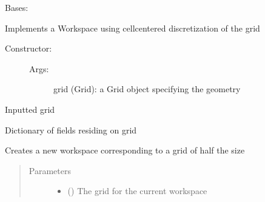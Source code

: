 \documentclass[letterpaper,10pt,english]{sphinxmanual}
\begin{document}
\begin{fulllineitems}
\label{\detokenize{autoapi/CellCenterWS/index:CellCenterWS.CellCenterWS}}
\sphinxAtStartPar
Bases: 

\sphinxAtStartPar
Implements a Workspace using cell\sphinxhyphen{}centered discretization of the grid
\begin{description}
\item[{Constructor:}] \leavevmode\begin{description}
\item[{Args:}] \leavevmode
\sphinxAtStartPar
grid (Grid): a Grid object specifying the geometry

\end{description}

\end{description}

\begin{fulllineitems}
\label{\detokenize{autoapi/CellCenterWS/index:CellCenterWS.CellCenterWS.self.grid}}
\sphinxAtStartPar
Inputted grid

\end{fulllineitems}


\begin{fulllineitems}
\label{\detokenize{autoapi/CellCenterWS/index:CellCenterWS.CellCenterWS.self.flds}}
\sphinxAtStartPar
Dictionary of fields residing on grid

\end{fulllineitems}


\begin{fulllineitems}
\label{\detokenize{autoapi/CellCenterWS/index:CellCenterWS.CellCenterWS.make_new}}
\sphinxAtStartPar
Creates a new workspace corresponding to a grid of half the size
\begin{quote}\begin{description}
\item[{Parameters}] \leavevmode\begin{itemize}
\item {} 
\sphinxAtStartPar
{} ({\hyperref[\detokenize{autoapi/Grid/index:Grid.Grid}]{}}) \textendash{} The grid for the current workspace


\end{itemize}
\end{description}
\end{quote}
\end{fulllineitems}
\end{fulllineitems}
\end{document}

